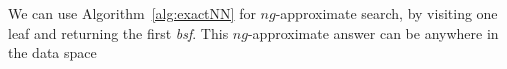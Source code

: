 \begin{comment}
\begin{algorithm}
\caption{{\color{myred}\underline{\underline{delta}}}{\color{myblue}\underline{Epsilon}}NN({$\bm{S_Q}$},{$\bm{idx}$},{$\bm{\delta}$},{$\bm{\epsilon}$}, {$\bm{F_Q(.)}$})}
\begin{algorithmic}[1]
\\{$\bm{pqueue}$} $\gets$ initialize a priority queue with the root node(s) of {$\bm{idx}$}; {\color{myred}\underline{\underline{${\bm {d^Q_\delta}}$  $\gets$ calcDQDelta({$\bm{S_Q}$},{$\bm{\delta}$}, {$\bm{F_Q(.)}$})}}}; 
\\{$\bm{bsf.dist}$} $\gets$ $\infty$ ; 
\\{$\bm{bsf.node}$} $\gets$ $NULL$;		
\\{$\bm{bsf}$} $\gets$ {\color{mygreen}\dashuline{ng-approxNN}}({{$\bm{S_Q}$},$\bm{idx}$}); 		
\\add {$\bm{bsf}$} to {$\bm{pqueue}$};
\While{ {$\bm{node}$} $\gets$ pop next node from {$\bm{pqueue}$ } } 
\If { calcMinDist({$\bm{S_Q}$},{$\bm{node}$}) $>$ {$\bm{bsf.dist} {\color{myblue}\underline{/(1+\epsilon)}}$ }}  
break;
\EndIf                 
\If {{$\bm{node}$} is a leaf}    \Comment{a leaf node}     
\For {each {{$\bm{S_C}$} in {$\bm{node}$} }}         
\State {$\bm{realDist}$} $\gets$ calcRealDist({$\bm{S_Q}$},{$\bm{S_C}$});
\If { {$\bm{realdist}$} $<$ {$\bm{bsf.dist}$}} 
\State {$\bm{bsf.dist}$} $\gets$ {$\bm{realDist}$} ;
\State {$\bm{bsf.node}$} $\gets$ {$\bm{node}$};
\Statex\hspace{2cm}{{\color{myred} \underline{\underline{if { {$\bm{bsf.dist}$} $\leq$ $(1+\epsilon)$ {$\bm {d^Q_\delta}$}} then break;}}}}
\EndIf                  
\EndFor        
\Else  \Comment{an internal node}
\For {each {{$\bm{childNode}$} in {$\bm{node}$} }}         
\State {$\bm{minDist}$} $\gets$ calcMinDist({$\bm{S_Q}$},{$\bm{childNode}$});
\If { {$\bm{minDist}$} $<$ {$\bm{bsf.dist}{\color{myblue}/\underline{(1+\epsilon)}}$} } 
\State add {$\bm{childNode}$} to {$\bm{pqueue}$ } with priority \State {$\bm{minDist}$}; 
\EndIf                  
\EndFor        
\EndIf 
\EndWhile\label{euclidendwhile}
\State \Return {$\bm{bsf}$}%
\end{algorithmic}
\label{alg:deltaepsilonNN}
\end{algorithm}
\end{comment}

We can use Algorithm~\ref{alg:exactNN} for $ng$-approximate search, by visiting one leaf and returning the first \emph{bsf}. 
This $ng$-approximate answer can be anywhere in the data space

